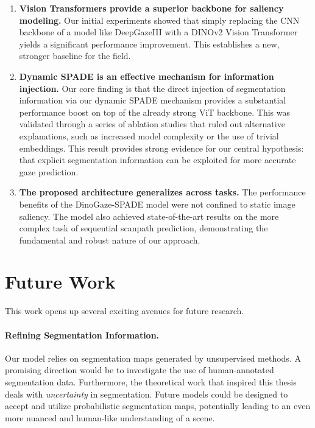 \begin{enumerate}
    \item \textbf{Vision Transformers provide a superior backbone for saliency modeling.} Our initial experiments showed that simply replacing the CNN backbone of a model like DeepGazeIII with a DINOv2 Vision Transformer yields a significant performance improvement. This establishes a new, stronger baseline for the field.
    
    \item \textbf{Dynamic SPADE is an effective mechanism for information injection.} Our core finding is that the direct injection of segmentation information via our dynamic SPADE mechanism provides a substantial performance boost on top of the already strong ViT backbone. This was validated through a series of ablation studies that ruled out alternative explanations, such as increased model complexity or the use of trivial embeddings. This result provides strong evidence for our central hypothesis: that explicit segmentation information can be exploited for more accurate gaze prediction.
    
    \item \textbf{The proposed architecture generalizes across tasks.} The performance benefits of the DinoGaze-SPADE model were not confined to static image saliency. The model also achieved state-of-the-art results on the more complex task of sequential scanpath prediction, demonstrating the fundamental and robust nature of our approach.
\end{enumerate}

\section{Future Work}

This work opens up several exciting avenues for future research.

\paragraph{Refining Segmentation Information.} Our model relies on segmentation maps generated by unsupervised methods. A promising direction would be to investigate the use of human-annotated segmentation data. Furthermore, the theoretical work that inspired this thesis deals with \emph{uncertainty} in segmentation. Future models could be designed to accept and utilize probabilistic segmentation maps, potentially leading to an even more nuanced and human-like understanding of a scene.

